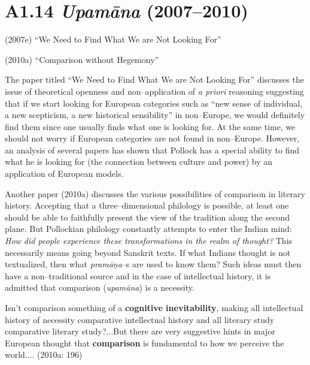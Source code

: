 \vspace{-.5cm}

\section*{A1.14 {\it{\textbf{Upamāna}}} (2007–2010)}

\vspace{-.3cm}

(2007e) “We Need to Find What We are Not Looking For”

(2010a) “Comparison without Hegemony”

The paper titled “We Need to Find What We are Not Looking For” discusses the issue of theoretical openness and non–application of \textit{a priori} reasoning suggesting that if we start looking for European categories such as “new sense of individual, a new scepticism, a new historical sensibility” in non–Europe, we would definitely find them since one usually finds what one is looking for. At the same time, we should not worry if European categories are not found in non–Europe. However, an analysis of several papers has shown that Pollock has a special ability to find what he is looking for (the connection between culture and power) by an application of European models.

Another paper (2010a) discusses the various possibilities of comparison in literary history. Accepting that a three–dimensional philology is possible, at least one should be able to faithfully present the view of the tradition along the second plane. But Pollockian philology constantly attempts to enter the Indian mind:\textit{ How did people experience these transformations in the realm of thought?} This necessarily means going beyond Sanskrit texts. If what Indians thought is not textualized, then what \textit{pramāṇa}–s are used to know them? Such ideas must then have a non–traditional source and in the case of intellectual history, it is admitted that comparison (\textit{upamāna}) is a necessity.

\begin{myquote}
Isn’t comparison something of a \textbf{cognitive inevitability}, making all intellectual history of necessity comparative intellectual history and all literary study comparative literary study?...But there are very suggestive hints in major European thought that \textbf{comparison} is fundamental to how we perceive the world.... (2010a: 196)
\end{myquote}

